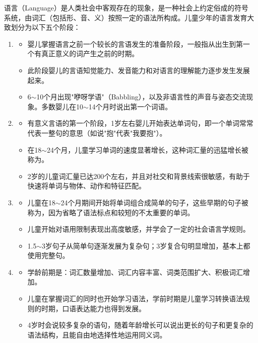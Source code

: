 \begin{keybox}
语言（Language）是人类社会中客观存在的现象，是一种社会上约定俗成的符号系统，由词汇（包括形、音、义）按照一定的语法所构成。儿童少年的语言发育大致划分为以下五个阶段：

\begin{enumerate}[leftmargin=*]
    \item {}
    \begin{itemize}[leftmargin=*]
        \item 婴儿掌握语言之前一个较长的言语发生的准备阶段，一般指从出生到第一个有真正意义的词产生之前的时期。
        \item 此阶段婴儿的言语知觉能力、发音能力和对语言的理解能力逐步发生发展起来。
        \item 6$\sim$10个月出现"咿呀学语"（Babbling），以及非语言性的声音与姿态交流现象。多数婴儿在10$\sim$14个月时说出第一个词语。
    \end{itemize}

    \item {}
    \begin{itemize}[leftmargin=*]
        \item 有意义言语的第一个阶段，1岁左右婴儿开始表达单词句，即一个单词常常代表一整句的意思（如说"抱"代表"我要抱"）。
        \item 在18$\sim$24个月，儿童学习单词的速度显著增长，这种词汇量的迅猛增长被称为。
        \item 2岁的儿童词汇量已达200个左右，并且对社交和背景线索很敏感，有助于快速将单词与物体、动作和特征匹配。
    \end{itemize}

    \item {}
    \begin{itemize}[leftmargin=*]
        \item 儿童在18$\sim$24个月期间开始将单词组合成简单的句子，这些早期的句子被称为，因为省略了语法标点和较短的不太重要的单词。
        \item 儿童开始对语用限制表现出高度敏感，并学会了一定的社会语言学规则。
        \item 1.5$\sim$3岁句子从简单句逐渐发展为复杂句；3岁复合句明显增加，基本上都使用完整句。
    \end{itemize}

    \item {}
    \begin{itemize}[leftmargin=*]
        \item 学龄前期是：词汇数量增加、词汇内容丰富、词类范围扩大、积极词汇增加。
        \item 儿童在掌握词汇的同时也开始学习语法，学前时期是儿童学习转换语法规则的时期，口语表达能力也得到发展。
        \item 4岁时会说较多复杂的语句，随着年龄增长可以说出更长的句子和更复杂的语法结构，且能自由地选择性地运用同义词。
    \end{itemize}


\end{enumerate}
\end{keybox}
